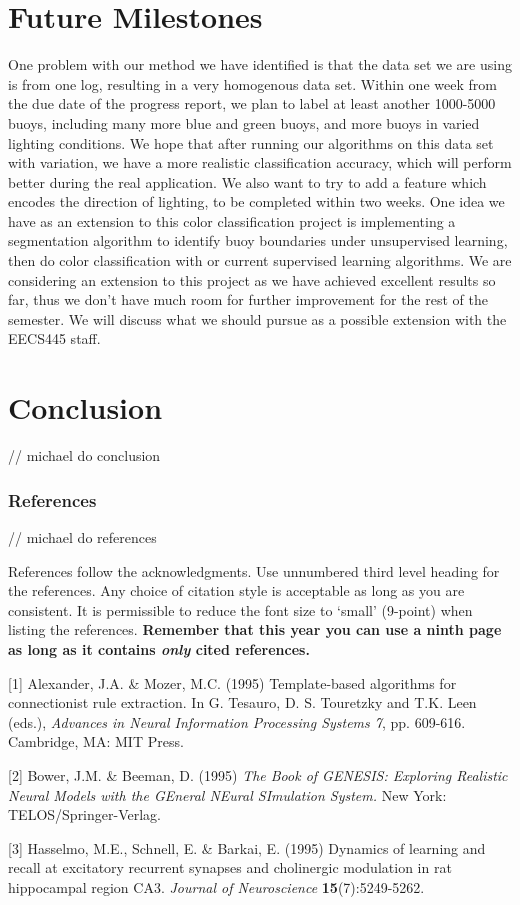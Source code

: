 \documentclass{article} %
\begin{document}
\section{Future Milestones}
One problem with our method we have identified is that the data set we are using is from one log, resulting in a very homogenous data set. Within one week from the due date of the progress report, we plan to label at least another 1000-5000 buoys, including many more blue and green buoys, and more buoys in varied lighting conditions. We hope that after running our algorithms on this data set with variation, we have a more realistic classification accuracy, which will perform better during the real application. We also want to try to add a feature which encodes the direction of lighting, to be completed within two weeks. One idea we have as an extension to this color classification project is implementing a segmentation algorithm to identify buoy boundaries under unsupervised learning, then do color classification with or current supervised learning algorithms. We are considering an extension to this project as we have achieved excellent results so far, thus we don't have much room for further improvement for the rest of the semester. We will discuss what we should pursue as a possible extension with the EECS445 staff. 
 

\section{Conclusion}

// michael do conclusion

\subsubsection*{References}

// michael do references

References follow the acknowledgments. Use unnumbered third level heading for
the references. Any choice of citation style is acceptable as long as you are
consistent. It is permissible to reduce the font size to `small' (9-point) 
when listing the references. {\bf Remember that this year you can use
a ninth page as long as it contains \emph{only} cited references.}

\small{
[1] Alexander, J.A. \& Mozer, M.C. (1995) Template-based algorithms
for connectionist rule extraction. In G. Tesauro, D. S. Touretzky
and T.K. Leen (eds.), {\it Advances in Neural Information Processing
Systems 7}, pp. 609-616. Cambridge, MA: MIT Press.

[2] Bower, J.M. \& Beeman, D. (1995) {\it The Book of GENESIS: Exploring
Realistic Neural Models with the GEneral NEural SImulation System.}
New York: TELOS/Springer-Verlag.

[3] Hasselmo, M.E., Schnell, E. \& Barkai, E. (1995) Dynamics of learning
and recall at excitatory recurrent synapses and cholinergic modulation
in rat hippocampal region CA3. {\it Journal of Neuroscience}
{\bf 15}(7):5249-5262.
}
\end{document}
